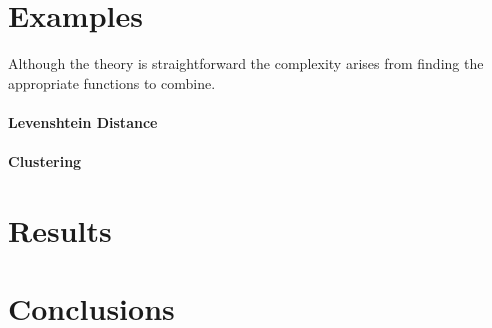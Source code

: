 \documentclass [12pt]{article} %
\begin{document}
\section{Examples}

Although the theory is straightforward the complexity arises from finding
the appropriate functions to combine.

\paragraph{Levenshtein Distance}

\paragraph{Clustering}

\section{Results}

\section{Conclusions}


\nocite{*}


\end{document}
